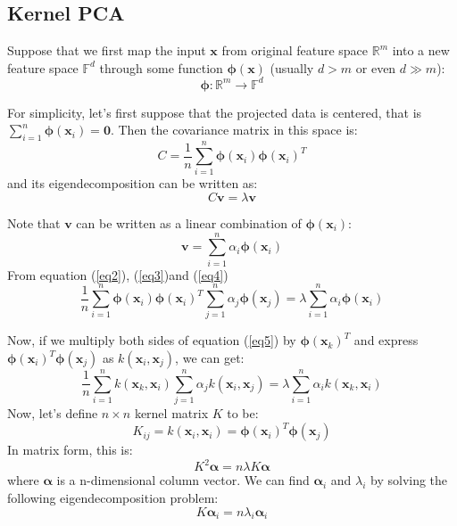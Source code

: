 \documentclass[tikz, multi,dvipsnames,svgnames,x11names]{article}
\begin{document}
\subsection{Kernel PCA}
\label{kernelPCA}

Suppose that we first map the input $\bm{x}$ from original feature space $\mathbb{R}^m$ into a new feature space $\mathbb{F}^d$ through some function $\bm{\phi(\bm{x})}$ (usually $d > m$ or even $d \gg m$):
\begin{equation}
\label{eq1}
\bm{\phi}: \mathbb{R}^m \rightarrow \mathbb{F}^d
\end{equation}

For simplicity, let's first suppose that the projected data is centered, that is $\sum_{i=1}^n \bm{\phi}(\bm{x}_i)=\bm 0$. Then the covariance matrix in this space is:
\begin{equation}
\label{eq2}
C = \frac{1}{n} \sum_{i=1}^n \bm{\phi}(\bm{x}_i) \bm{\phi}(\bm{x}_i)^T
\end{equation}
and its eigendecomposition can be written as:
\begin{equation}
\label{eq3}
C\bm{v} = \lambda \bm{v}
\end{equation}

Note that $\bm v$ can be written as a linear combination of $\bm{\phi}(\bm{x}_i)$:
\begin{equation}
\label{eq4}
\bm{v} = \sum_{i=1}^n \alpha_i \bm{\phi}(\bm{x}_i)
\end{equation}
From equation (\ref{eq2}), (\ref{eq3})and (\ref{eq4}) 
\begin{equation}
\label{eq5}
\frac{1}{n} \sum_{i=1}^n \bm{\phi}(\bm{x}_i) \bm{\phi}(\bm{x}_i)^T  \sum_{j=1}^n \alpha_j \bm{\phi}(\bm{x}_j) = \lambda \sum_{i=1}^n \alpha_i \bm{\phi}(\bm{x}_i)
\end{equation}

Now, if we multiply both sides of equation (\ref{eq5}) by $\bm{\phi}(\bm{x}_k)^T$ and express $\bm{\phi}(\bm{x}_i)^T \bm{\phi}(\bm{x}_j)$ as $k(\bm{x}_i, \bm{x}_j)$, we can get:
\begin{equation}
\label{eq6}
\frac{1}{n} \sum_{i=1}^n k(\bm{x}_k, \bm{x}_i) \sum_{j=1}^n \alpha_j k(\bm{x}_i, \bm{x}_j) = \lambda \sum_{i=1}^n \alpha_i k(\bm{x}_k, \bm{x}_i)
\end{equation}
Now, let's define $n \times n$ kernel matrix $K$ to be:
\begin{equation}
\label{eq7}
K_{ij} = k(\bm{x}_i, \bm{x}_i) = \bm{\phi}(\bm{x}_i)^T \bm{\phi}(\bm{x}_j)
\end{equation}	
In matrix form, this is:
\begin{equation}
\label{eq8}
K^2 \bm{\alpha} = n\lambda K \bm{\alpha}
\end{equation}
where $\bm{\alpha}$ is a n-dimensional column vector. We can find $\bm{\alpha}_i$ and $\lambda_i$ by solving the following eigendecomposition problem:
\begin{equation}
\label{eq9}
K \bm{\alpha}_i = n\lambda_i \bm{\alpha}_i
\end{equation}
\end{document}

